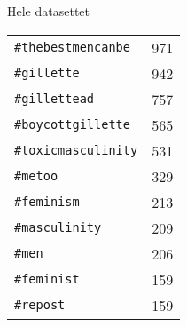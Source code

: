 \centering
\captionsetup{justification=centering,singlelinecheck=off}
\caption{
  Hele datasettet
}
\begin{tabular}{lr}

\texttt{\#thebestmencanbe}  & 971 \\
\texttt{\#gillette}         & 942 \\
\texttt{\#gillettead}       & 757 \\
\texttt{\#boycottgillette}  & 565 \\
\texttt{\#toxicmasculinity} & 531 \\
\texttt{\#metoo}            & 329 \\
\texttt{\#feminism}        & 213 \\
\texttt{\#masculinity}      & 209 \\
\texttt{\#men}              & 206 \\
\texttt{\#feminist}         & 159 \\
\texttt{\#repost}           & 159

\end{tabular}
